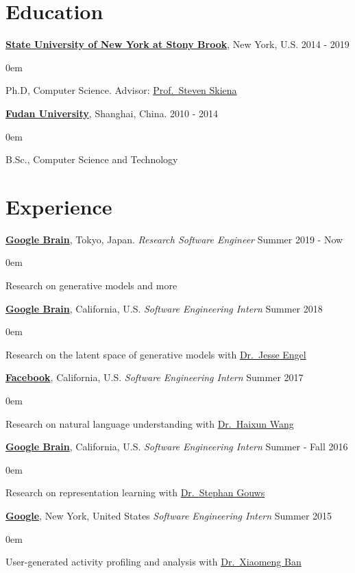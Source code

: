 \documentclass[line,margin]{cv}
\makeatletter
\newenvironment{block}
{
	\begin{addmargin}[2em]{0em}%
}
{
	\end{addmargin}
}
\newcommand{\SUNY}{\href{http://www.stonybrook.edu/}{State University of New York at Stony Brook}}
\newcommand{\Google}{\href{https://www.google.com/}{Google}}
\newcommand{\GoogleBrain}{\href{http://research.google.com/teams/brain/}{Google Brain}}
\newcommand{\Facebook}{\href{https://www.facebook.com/}{Facebook}}
\newcommand{\Fudan}{\href{http://www.fudan.edu.cn/englishnew/}{Fudan University}}
\newcommand{\MyMail}{\href{mailto:alan.yt.tian@gmail.com}{alan.yt.tian@gmail.com}}
\newcommand{\Haixun}{\href{http://haixun.olidu.com/}{Dr.\ Haixun Wang}}
\newcommand{\Xiaomeng}{\href{https://www.linkedin.com/in/xiaomengban/}{Dr.\ Xiaomeng Ban}}
\newcommand{\Skiena}{\href{https://www3.cs.stonybrook.edu/~skiena/}{Prof.\ Steven Skiena}}
\newcommand{\sgouws}{\href{http://research.google.com/pubs/StephanGouws.html}{Dr.\ Stephan Gouws}}
\newcommand{\jesseengel}{\href{https://ai.google/research/people/JesseEngel}{Dr.\ Jesse Engel}}
\makeatother
\begin{document}

\address{\textit{E-mail:} \MyMail}

\begin{resume}

\section{Education}

	{\bf \SUNY}, New York, U.S. \hfill 2014 - 2019
	\begin{block}
		Ph.D, Computer Science. Advisor: \Skiena
	\end{block}

	{\bf \Fudan}, Shanghai, China. \hfill 2010 - 2014

	\begin{block}
		B.Sc., Computer Science and Technology 
	\end{block}

\section{Experience}

	{\bf \GoogleBrain}, Tokyo, Japan. {\itshape Research Software Engineer} \hfill Summer 2019 - Now
	\begin{block}
		Research on generative models and more
	\end{block}

	{\bf \GoogleBrain}, California, U.S. {\itshape Software Engineering Intern} \hfill Summer 2018
	\begin{block}
		Research on the latent space of generative models with \jesseengel
	\end{block}

	{\bf \Facebook}, California, U.S. {\itshape Software Engineering Intern} \hfill Summer 2017
	\begin{block}
		Research on natural language understanding with \Haixun
	\end{block}

	{\bf \GoogleBrain}, California, U.S. {\itshape Software Engineering Intern} \hfill Summer - Fall 2016
	\begin{block}
		Research on representation learning with \sgouws
	\end{block}

	{\bf \Google}, New York, United States {\itshape Software Engineering Intern} \hfill Summer 2015
	\begin{block}
		User-generated activity profiling and analysis with \Xiaomeng
	\end{block}


\end{resume}
\end{document}
